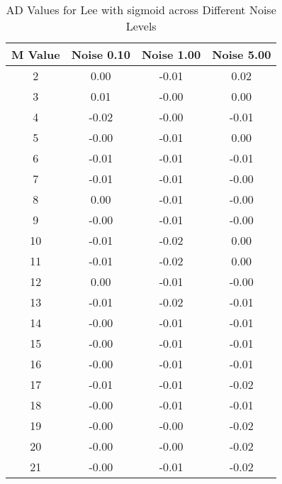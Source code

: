 \begin{table}[htb]
\small
\centering
\begin{tabular}{|c|c|c|c|} \hline
M Value & Noise 0.10 & Noise 1.00 & Noise 5.00 \\ \hline
2 & 0.00 & -0.01 & 0.02 \\ \hline
3 & 0.01 & -0.00 & 0.00 \\ \hline
4 & -0.02 & -0.00 & -0.01 \\ \hline
5 & -0.00 & -0.01 & 0.00 \\ \hline
6 & -0.01 & -0.01 & -0.01 \\ \hline
7 & -0.01 & -0.01 & -0.00 \\ \hline
8 & 0.00 & -0.01 & -0.00 \\ \hline
9 & -0.00 & -0.01 & -0.00 \\ \hline
10 & -0.01 & -0.02 & 0.00 \\ \hline
11 & -0.01 & -0.02 & 0.00 \\ \hline
12 & 0.00 & -0.01 & -0.00 \\ \hline
13 & -0.01 & -0.02 & -0.01 \\ \hline
14 & -0.00 & -0.01 & -0.01 \\ \hline
15 & -0.00 & -0.01 & -0.01 \\ \hline
16 & -0.00 & -0.01 & -0.01 \\ \hline
17 & -0.01 & -0.01 & -0.02 \\ \hline
18 & -0.00 & -0.01 & -0.01 \\ \hline
19 & -0.00 & -0.00 & -0.02 \\ \hline
20 & -0.00 & -0.00 & -0.02 \\ \hline
21 & -0.00 & -0.01 & -0.02 \\ \hline
\end{tabular}
\caption{AD Values for Lee with sigmoid across Different Noise Levels}
\end{table}


